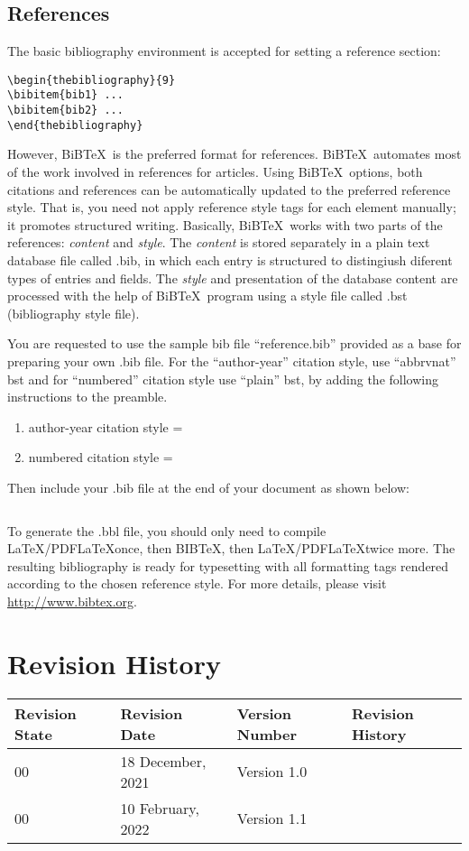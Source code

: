\documentclass{article}
\begin{document}
\subsection{References}
The basic bibliography environment is accepted for setting a reference section:

\begin{verbatim}
\begin{thebibliography}{9}
\bibitem{bib1} ...
\bibitem{bib2} ...
\end{thebibliography}
\end{verbatim}
However, BiB\TeX\ is the preferred format for references. BiB\TeX\ automates most of the work involved in references for articles. Using BiB\TeX\ options, both citations and references can be automatically updated to the preferred reference style. That is, you need not apply reference style tags for each element manually; it promotes structured writing. Basically, BiB\TeX\ works with two parts of the references: \textit{content} and \textit{style}. The \textit{content} is stored separately in a plain text database file called .bib, in which each entry is structured to distingiush diferent types of entries and fields. The \textit{style} and presentation of the database content are processed with the help of BiB\TeX\ program using a style file called .bst (bibliography style file).

You are requested to use the sample bib file ``reference.bib'' provided as a base for preparing your own .bib file. For the ``author-year'' citation style, use ``abbrvnat'' bst and for ``numbered'' citation style use ``plain'' bst, by adding the following instructions to the preamble.

\begin{enumerate}
\item author-year citation style = \verb++
\item numbered citation style = \verb++
\end{enumerate}

Then include your .bib file at the end of your document as shown below:
\begin{verbatim}

\end{verbatim}
To generate the .bbl file, you should only need to compile \LaTeX/PDF\LaTeX once, then BIB\TeX, then \LaTeX/PDF\LaTeX twice more. The resulting bibliography is ready for typesetting with all formatting tags rendered according to the chosen reference style. For more details, please visit \url{http://www.bibtex.org}.


\section{Revision History}

\begin{tabular}{|l|l|l|l|}
\hline
Revision State & Revision Date &  Version Number & Revision History\\
\hline
 00 &    18 December, 2021 & Version 1.0   &   \\
\hline
 00 &    10 February, 2022 & Version 1.1   &   \\
 \hline
\end{tabular}
\end{document}
